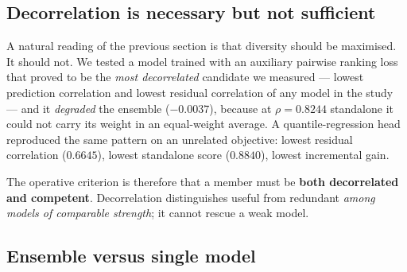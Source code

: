 \documentclass[11pt]{article}
\newcommand{\rhoS}{\rho}
\begin{document}
\subsection{Decorrelation is necessary but not sufficient}

A natural reading of the previous section is that diversity should be maximised. It
should not. We tested a model trained with an auxiliary pairwise ranking loss that
proved to be the \emph{most decorrelated} candidate we measured --- lowest prediction
correlation and lowest residual correlation of any model in the study --- and it
\emph{degraded} the ensemble ($-0.0037$), because at $\rhoS=0.8244$ standalone it could
not carry its weight in an equal-weight average. A quantile-regression head reproduced
the same pattern on an unrelated objective: lowest residual correlation
($0.6645$), lowest standalone score ($0.8840$), lowest incremental gain.

The operative criterion is therefore that a member must be \textbf{both decorrelated
and competent}. Decorrelation distinguishes useful from redundant \emph{among models of
comparable strength}; it cannot rescue a weak model.

\subsection{Ensemble versus single model}
\label{sec:ens-honest}
\end{document}
